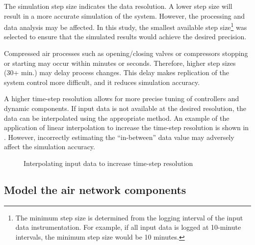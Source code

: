 	\par 
	The simulation step size indicates the data resolution. A lower step size will result in a more accurate simulation of the system. However, the processing and data analysis may be affected. In this study, the smallest available step size\footnote{The minimum step size is determined from the logging interval of the input data instrumentation. For example, if all input data is logged at 10-minute intervals, the minimum step size would be 10 minutes.} was selected to ensure that the simulated results would achieve the desired precision. 
	\par 
	 Compressed air processes such as opening/closing valves or compressors stopping or starting may occur within minutes or seconds. Therefore, higher step sizes (30+ min.) may delay process changes. This delay makes replication of the system control more difficult, and it reduces simulation accuracy.
	\par
	A higher time-step resolution allows for more precise tuning of controllers and dynamic components. If input data is not available at the desired resolution, the data can be interpolated using the appropriate method. An example of the application of linear interpolation to increase the time-step resolution is shown in . However, incorrectly estimating the \enquote{in-between}  data value may adversely affect the simulation accuracy.
	
	\begin{figure}[h]
		\centering
		\fbox{}
		\caption{Interpolating input data to increase time-step resolution}
		\label{fig: Inter}
	\end{figure}
	\subsection{Model the air network components}
